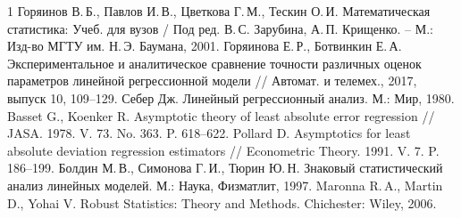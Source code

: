 \documentclass[12pt,a4paper]{article}
\begin{document}
	\newpage
	\begin{center}
		\begin{thebibliography}{1}
			 Горяинов В.\,Б., Павлов И.\,В., Цветкова Г.\,М., Тескин О.\,И. Математическая статистика: Учеб. для вузов / Под ред. В.\,С. Зарубина, А.\,П. Крищенко. -- М.: Изд-во МГТУ им. Н.\,Э. Баумана, 2001.
			 Горяинова Е.\,Р., Ботвинкин Е.\,А. Экспериментальное и
			аналитическое сравнение точности различных оценок параметров линейной регрессионной модели // Автомат. и телемех., 2017, выпуск 10, 109--129.
			 Себер Дж. Линейный регрессионный анализ. М.: Мир, 1980.
			 Basset G., Koenker R. Asymptotic theory of least absolute error regression // JASA. 1978. V. 73. No. 363. P. 618--622.
			 Pollard D. Asymptotics for least absolute deviation regression estimators // Econometric Theory. 1991. V. 7. P. 186--199.
			 Болдин М.\,В., Симонова Г.\,И., Тюрин Ю.\,Н. Знаковый статистический анализ линейных моделей. М.: Наука, Физматлит, 1997.
			 Maronna R.\,A., Martin D., Yohai V. Robust Statistics: Theory and Methods. Chichester: Wiley, 2006.
		\end{thebibliography}
	\end{center}
	
\end{document}
